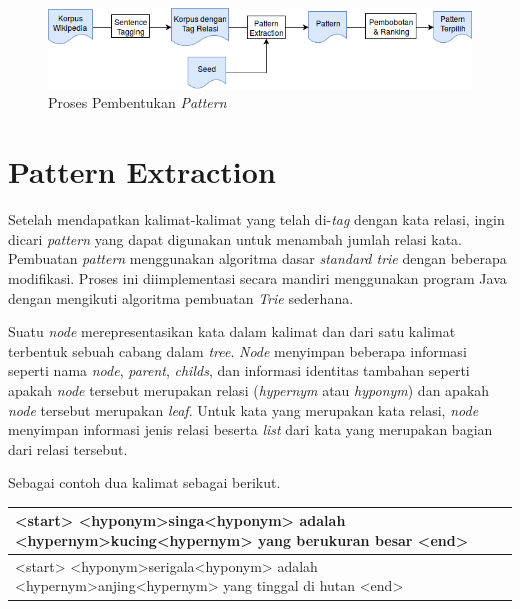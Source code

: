 \begin{figure}
    \centering
    \includegraphics[width=\linewidth]{pics/Pic03-PatternExtraction}
    \caption{Proses Pembentukan \textit{Pattern}}
    \label{fig:pattern-extraction}
\end{figure}

\section{Pattern Extraction}
Setelah mendapatkan kalimat-kalimat yang telah di-\textit{tag} dengan kata relasi, ingin dicari \textit{pattern} yang dapat digunakan untuk menambah jumlah relasi kata. Pembuatan \textit{pattern} menggunakan algoritma dasar \textit{standard trie} dengan beberapa modifikasi. Proses ini diimplementasi secara mandiri menggunakan program Java dengan mengikuti algoritma pembuatan \textit{Trie} sederhana.

Suatu \textit{\textit{node}} merepresentasikan kata dalam kalimat dan dari satu kalimat terbentuk sebuah cabang dalam \textit{tree}. \textit{Node} menyimpan beberapa informasi seperti nama \textit{\textit{node}}, \textit{parent}, \textit{childs}, dan informasi identitas tambahan seperti apakah \textit{\textit{node}} tersebut merupakan relasi (\textit{hypernym} atau \textit{hyponym}) dan apakah \textit{\textit{node}} tersebut merupakan \textit{leaf}. Untuk kata yang merupakan kata relasi, \textit{\textit{node}} menyimpan informasi jenis relasi beserta \textit{list} dari kata yang merupakan bagian dari relasi tersebut. 

\noindent Sebagai contoh dua kalimat sebagai berikut.
\begin{center}
\begin{tabular}{ | m{32em} | } 
\hline
<start> <hyponym>singa<hyponym> adalah <hypernym>kucing<hypernym> yang berukuran besar <end> \\ 
\hline
\hline
<start> <hyponym>serigala<hyponym> adalah <hypernym>anjing<hypernym> yang tinggal di hutan <end>\\ 
\hline
\end{tabular}
\end{center}

